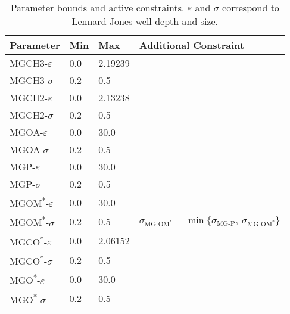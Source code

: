 \beginsupplemental
\begin{table}[h!]
    \tiny
\begin{tabularx}{\textwidth}{X|X|X|X}
\hline
\textbf{Parameter} & \textbf{Min} & \textbf{Max} & \textbf{Additional Constraint} \\
\hline
MGCH3-$\varepsilon$                   & 0.0 & 2.19239 & \\\hline
MGCH3-$\sigma$                        & 0.2 & 0.5     & \\\hline
MGCH2-$\varepsilon$                   & 0.0 & 2.13238 & \\\hline
MGCH2-$\sigma$                        & 0.2 & 0.5     & \\\hline
MGOA-$\varepsilon$                    & 0.0 & 30.0    & \\\hline
MGOA-$\sigma$                         & 0.2 & 0.5     & \\\hline
MGP-$\varepsilon$                     & 0.0 & 30.0    & \\\hline
MGP-$\sigma$                          & 0.2 & 0.5     & \\\hline
MGOM\textsuperscript{*}-$\varepsilon$ & 0.0 & 30.0    & \\\hline
MGOM\textsuperscript{*}-$\sigma$      & 0.2 & 0.5     & $\sigma_{\text{MG-OM}^*} = \min\big\{\sigma_{\text{MG-P}},\ \sigma_{\text{MG-OM}^*}\big\} $\\\hline
MGCO\textsuperscript{*}-$\varepsilon$ & 0.0 & 2.06152 & \\\hline
MGCO\textsuperscript{*}-$\sigma$      & 0.2 & 0.5     & \\\hline
MGO\textsuperscript{*}-$\varepsilon$  & 0.0 & 30.0    & \\\hline
MGO\textsuperscript{*}-$\sigma$       & 0.2 & 0.5     & \\\hline
\hline
\end{tabularx}
\caption[Parameter bounds and active constraints]{Parameter bounds and active constraints. $\varepsilon$ and $\sigma$ correspond to Lennard-Jones well depth and size.}
\label{tab:constrain}
\end{table}
